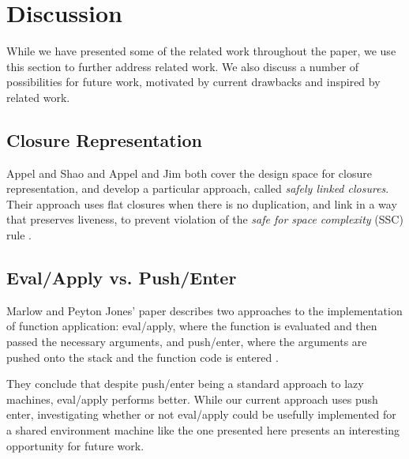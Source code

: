 \section{Discussion} \label{sec:disc}

While we have presented some of the related work throughout the paper, we use
this section to further address related work. We also discuss a number of
possibilities for future work, motivated by current drawbacks and inspired by
related work. 

\subsection{Closure Representation}

Appel and Shao \cite{shao1994space} and Appel and Jim \cite{appel1988optimizing}
both cover the design space for closure representation, and develop a particular
approach, called \emph{safely linked closures}. Their approach uses flat
closures when there is no duplication, and link in a way that preserves
liveness, to prevent violation of the \emph{safe for space complexity} (SSC)
rule \cite{appel2006compiling}.

\subsection{Eval/Apply vs. Push/Enter}

Marlow and Peyton Jones' paper describes two approaches to the implementation of
function application: eval/apply, where the function is evaluated and then
passed the necessary arguments, and push/enter, where the arguments are pushed
onto the stack and the function code is entered \cite{marlow2006making}.

They conclude that despite push/enter being a standard approach to lazy
machines, eval/apply performs better. While our current approach uses push
enter, investigating whether or not eval/apply could be usefully implemented for
a shared environment machine like the one presented here presents an interesting
opportunity for future work.

